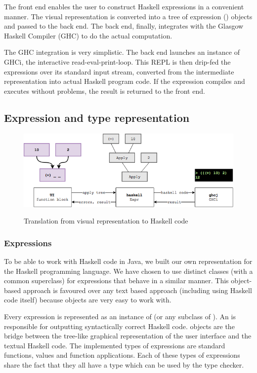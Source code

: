 The front end enables the user to construct Haskell expressions in a convenient manner.
The visual representation is converted into a tree of expression () objects and passed to the back end. 
The back end, finally, integrates with the Glasgow Haskell Compiler (\gls{GHC}) to do the actual computation.

The GHC integration is very simplistic.
The back end launches an instance of GHCi, the interactive read-eval-print-loop. 
This \gls{REPL} is then drip-fed the expressions over its standard input stream, converted from the intermediate representation into actual Haskell program code.
If the expression compiles and executes without problems, the result is returned to the front end.

\subsection{Expression and type representation}

\begin{figure}[h]
	\centering
	\includegraphics[scale=0.5]{Images/exprtohaskell}
	\label{fig:exprtohaskell}
	\caption{Translation from visual representation to Haskell code}
\end{figure}

\subsubsection{Expressions}
 

To be able to work with Haskell code in Java, we built our own representation for the Haskell programming language.
We have chosen to use distinct classes (with a common superclass) for expressions that behave in a similar manner.
This object-based approach is favoured over any text based approach (including using Haskell code itself) because objects are very easy to work with.

Every expression is represented as an instance of  (or any subclass of ). 
An  is responsible for outputting syntactically correct Haskell code.  objects are the bridge between the tree-like graphical representation of the user interface and the textual Haskell code.
The implemented types of expressions are standard functions, values and function applications.
Each of these types of expressions share the fact that they all have a type which can be used by the type checker.

